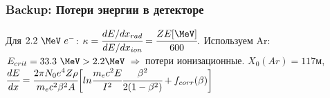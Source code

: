 \documentclass[14pt]{beamer}
\newcommand{\backupend}{
	\setcounter{framenumber}{\value{finalframe}}
}
\begin{document}
\begin{frame}[t]
\frametitle{Backup: Потери энергии в детекторе}
Для $2.2~\MeV~e^{-}$:
\newline
\newline $\kappa = \cfrac{dE/dx_{rad}}{dE/dx_{ion}}= \cfrac{ Z E[\MeV] }{600}.$
\newline 
\newline Используем Ar: $E_{crit} = 33.3~\MeV > 2.2 \MeV~\Rightarrow$ потери ионизационные.
\newline
\newline $X_0(Ar)=117$м,
\newline
\newline $\cfrac{dE}{dx} = \cfrac{2\pi N_0 e^4 Z\rho}{m_e c^2 \beta^2 A}\biggl[ln\cfrac{ m_ec^2E}{I^2}\cfrac{\beta^2}{2(1-\beta^2)} + f_{corr}(\beta)\biggr]$

\end{frame}

\backupend
\end{document}
